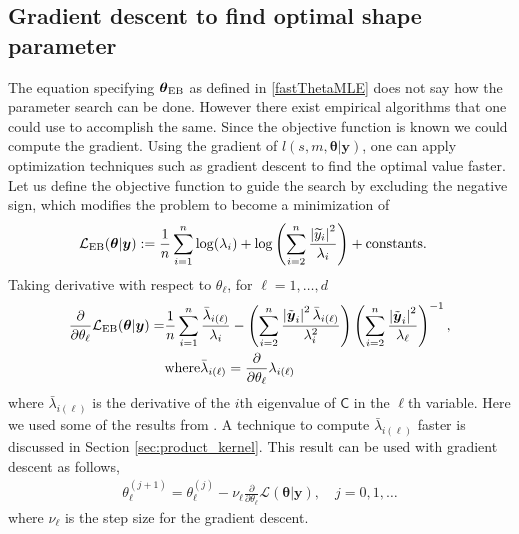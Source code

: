 \documentclass{svjour3}                     %
\newcommand{\bm}[1]{\boldsymbol{#1}}
\newcommand{\vtheta}{{\bm{\theta}}}
\newcommand{\vy}{\bm{y}}
\newcommand{\tvy}{\tilde{\bm{y}}}
\newcommand{\vone}{\bm{1}}
\newcommand{\mC}{\mathsf{C}}
\newcommand{\mCInv}{\mathsf{C}^{-1}}
\newcommand{\MLE}{\textup{EB}}
\def\abs#1{\ensuremath{\left \lvert #1 \right \rvert}}
\begin{document}
\subsection{Gradient descent to find optimal shape parameter}
\label{grad_descent_MLE}
The equation specifying $\vtheta_\MLE$ as defined in \eqref{fastThetaMLE} does not say how the parameter search can be done. However there exist empirical algorithms \cite{Bre73, For77} that one could use to accomplish the same.
Since the objective function is known we could compute the gradient.
Using the gradient of $l(s,m,\vtheta | \vy)$, one can apply optimization techniques such as gradient descent to find the optimal value faster. Let us define the objective function to guide the search by excluding the negative sign, which modifies the problem to become a minimization of
\begin{align*}
\mathcal{L}_{\MLE}(\vtheta | \vy)
&:= %
\frac{1}{n}\sum_{i=1}^n \log(\lambda_{i}) + 
\log\left(
\sum_{i=2}^n \frac{\abs{\widetilde{y}_i}^2}{\lambda_{i}}
\right) + \text{constants.}
\end{align*}
Taking derivative with respect to $\theta_\ell$, for $\ell=1,\dots,d$
\begin{align}
\label{eqn:deriv_obj_func_MLE}
\frac{\partial}{\partial \theta_\ell} \mathcal{L}_{\MLE}(\vtheta | \vy)
= & \frac 1n \sum_{i=1}^{n} \frac{\bar{\lambda}_{i(\ell)}}{\lambda_i}
- \left({ \sum_{i=2}^n \frac{\abs{\tvy_i}^2 \bar{\lambda}_{i(\ell)}}{\lambda_i^2}}\right)
\left( {\sum_{i=2}^n \frac{\abs{\tvy_i}^2}{\lambda_\ell}} \right)^{-1}, \\
& \text{where} \bar{\lambda}_{i(\ell)} = \frac{\partial}{\partial \theta_\ell} {\lambda}_{i(\ell)}
\end{align}
where $\bar{\lambda}_{i(\ell)}$ is the derivative of the $i$th eigenvalue of $\mC$ in the $\ell$th variable. 
Here we used some of the results from \cite{Dong2017a}. A technique to compute $\bar{\lambda}_{i(\ell)}$ faster is discussed in Section \ref{sec:product_kernel}.
This result can be used with gradient descent as follows,
\begin{align}
\label{eqn:deep_descent}
\theta_\ell^{(j+1)} = \theta_\ell^{(j)} - \nu_\ell \frac{\partial}{\partial \theta_\ell} \mathcal{L}(\vtheta | \vy), \quad j=0,1,\dots
\end{align}
where $\nu_\ell$ is the step size for the gradient descent. 
\end{document}
